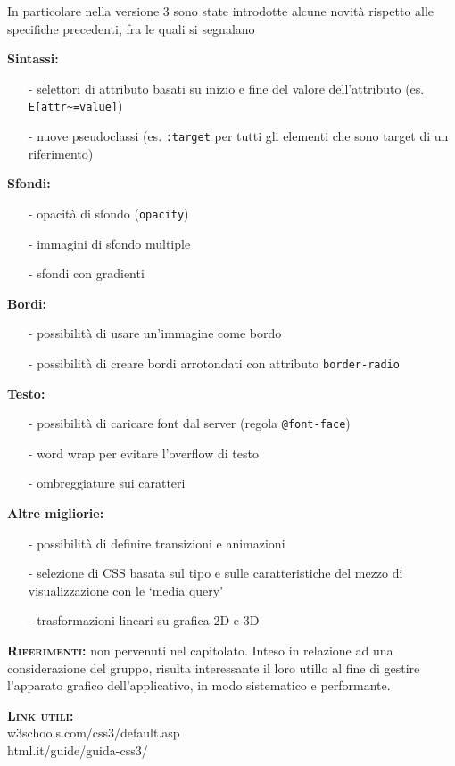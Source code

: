 \begin{description}
In particolare nella versione 3 sono state introdotte alcune novità rispetto alle specifiche precedenti, fra le quali si segnalano
\begin{description}
\item{\bfseries Sintassi:}
  \begin{itemize}
    \item[-] selettori di attributo basati su inizio e fine del valore dell'attributo (es. \texttt{E[attr\textasciitilde=value]})
    \item[-] nuove pseudoclassi (es. \texttt{:target} per tutti gli elementi che sono target di un riferimento)
  \end{itemize}
\item{\bfseries Sfondi:}
  \begin{itemize}
    \item[-] opacità di sfondo (\texttt{opacity})
    \item[-] immagini di sfondo multiple
    \item[-] sfondi con gradienti
  \end{itemize}
\item{\bfseries Bordi:}
  \begin{itemize}
    \item[-] possibilità di usare un'immagine come bordo
    \item[-] possibilità di creare bordi arrotondati con attributo \texttt{border-radio}
  \end{itemize}
\item{\bfseries Testo:}
  \begin{itemize}
    \item[-] possibilità di caricare font dal server (regola \texttt{@font-face})
    \item[-] word wrap per evitare l'overflow di testo
    \item[-] ombreggiature sui caratteri
  \end{itemize}
\item{\bfseries Altre migliorie:}
  \begin{itemize}
    \item[-] possibilità di definire transizioni e animazioni
    \item[-] selezione di CSS basata sul tipo e sulle caratteristiche del mezzo di visualizzazione con le `media query'
    \item[-] trasformazioni lineari su grafica 2D e 3D
  \end{itemize}
\end{description}
	\item{\scshape\bfseries Riferimenti:} non pervenuti nel capitolato. Inteso in relazione ad una considerazione del gruppo, risulta interessante il loro utillo al fine di gestire l'apparato grafico dell'applicativo, in modo sistematico e performante.
	\item{\scshape\bfseries Link utili:}\\
  w3schools.com/css3/default.asp\\
  html.it/guide/guida-css3/
\end{description}

